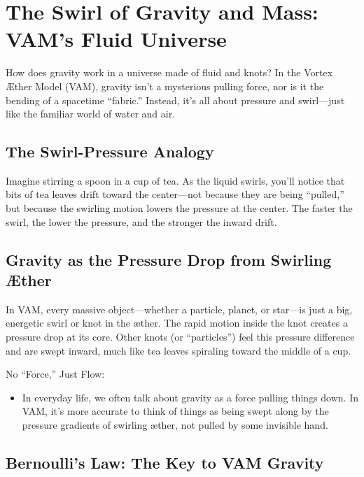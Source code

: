 
\section{The Swirl of Gravity and Mass: VAM’s Fluid Universe}

How does gravity work in a universe made of fluid and knots? In the Vortex Æther Model (VAM), gravity isn’t a mysterious pulling force, nor is it the bending of a spacetime “fabric.” Instead, it’s all about pressure and swirl—just like the familiar world of water and air.


\subsection*{The Swirl-Pressure Analogy}

Imagine stirring a spoon in a cup of tea. As the liquid swirls, you’ll notice that bits of tea leaves drift toward the center—not because they are being “pulled,” but because the swirling motion lowers the pressure at the center. The faster the swirl, the lower the pressure, and the stronger the inward drift.


\subsection*{Gravity as the Pressure Drop from Swirling Æther}

In VAM, every massive object—whether a particle, planet, or star—is just a big, energetic swirl or knot in the æther. The rapid motion inside the knot creates a pressure drop at its core. Other knots (or “particles”) feel this pressure difference and are swept inward, much like tea leaves spiraling toward the middle of a cup.


No “Force,” Just Flow:


\begin{itemize}

\item
In everyday life, we often talk about gravity as a force pulling things down. In VAM, it’s more accurate to think of things as being swept along by the pressure gradients of swirling æther, not pulled by some invisible hand.




\end{itemize}

\subsection*{Bernoulli’s Law: The Key to VAM Gravity}

